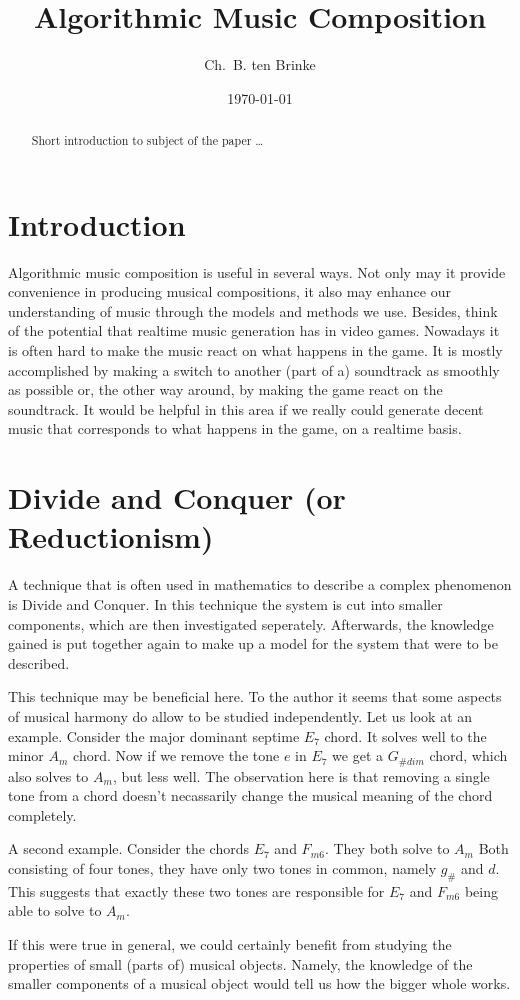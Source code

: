\documentclass{article}
\title{Algorithmic Music Composition}
\author{Ch.\ B. ten Brinke}
\date{\today}
\begin{document}
\maketitle

\begin{abstract}
Short introduction to subject of the paper \ldots 
\end{abstract}

\section{Introduction}
Algorithmic music composition is useful in several ways.
Not only may it provide convenience in producing musical compositions, it also may enhance our understanding of music through the models and methods we use.
Besides, think of the potential that realtime music generation has in video games.
Nowadays it is often hard to make the music react on what happens in the game.
It is mostly accomplished by making a switch to another (part of a) soundtrack as smoothly as possible or, the other way around, by making the game react on the soundtrack.
It would be helpful in this area if we really could generate decent music that corresponds to what happens in the game, on a realtime basis.

\section{Divide and Conquer (or Reductionism)}
A technique that is often used in mathematics to describe a complex phenomenon is Divide and Conquer.
In this technique the system is cut into smaller components, which are then 
investigated seperately.
Afterwards, the knowledge gained is put together again to make up a model for the system that were to be described.

This technique may be beneficial here.
To the author it seems that some aspects of musical harmony do allow to be studied independently.
Let us look at an example.
Consider the major dominant septime $E_7$ chord.
It solves well to the minor $A_m$ chord.
Now if we remove the tone $e$ in $E_7$ we get a $G_{\#dim}$ chord, which also solves to $A_m$, but less well.
The observation here is that removing a single tone from a chord doesn't necassarily change the musical meaning of the chord completely.

A second example.
Consider the chords $E_7$ and $F_{m6}$.
They both solve to $A_m$
Both consisting of four tones, they have only two tones in common, namely $g_\#$ and $d$.
This suggests that exactly these two tones are responsible for $E_7$ and $F_{m6}$ being able to solve to $A_m$.

If this were true in general, we could certainly benefit from studying the properties of small (parts of) musical objects.
Namely, the knowledge of the smaller components of a musical object would tell us how the bigger whole works.
\end{document}
